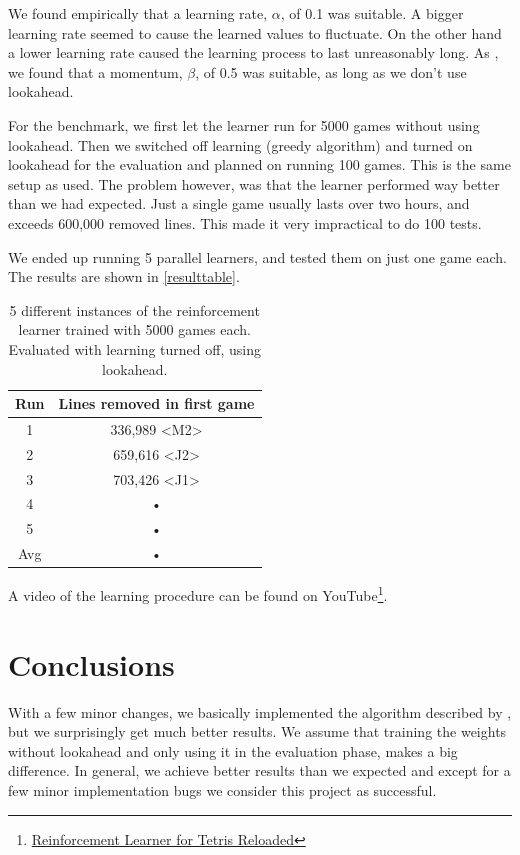 \documentclass{ml}
\begin{document}
We found empirically that a learning rate, $\alpha$, of 0.1 was suitable. A bigger learning rate seemed to cause the learned values to fluctuate.
On the other hand a lower learning rate caused the learning process to last unreasonably long. 
As \cite{zucker2009learning}, we found that a momentum, $\beta$, of 0.5 was suitable, as long as we don't use lookahead.

For the benchmark, we first let the learner run for 5000 games without using lookahead.
Then we switched off learning (greedy algorithm) and turned on lookahead for the evaluation and planned on running 100 games.
This is the same setup as \cite{zucker2009learning} used.
The problem however, was that the learner performed way better than we had expected. Just a single game usually lasts over two hours, and exceeds 600,000 removed lines.
This made it very impractical to do 100 tests. 

We ended up running 5 parallel learners, and tested them on just one game each. 
The results are shown in \autoref{resulttable}.

\begin{table}
\begin{center}
\begin{tabular}{|c|c|}
\hline 
Run & Lines removed in first game \\ 
\hline 
1 & 336,989 <M2> \\ 
\hline 
2 & 659,616 <J2> \\ 
\hline 
3 & 703,426 <J1> \\ 
\hline 
4 & • \\ 
\hline 
5 & • \\ 
\hline 
Avg & • \\ 
\hline 
\end{tabular}
\caption{5 different instances of the reinforcement learner trained with 5000 games each. Evaluated with learning turned off, using lookahead.}
\label{resulttable}
\end{center}
\end{table}


A video of the learning procedure can be found on YouTube\footnote{\href{http://www.youtube.com/watch?v=DXgtzFiRHdc}{Reinforcement Learner for Tetris Reloaded}}.


\section{Conclusions}
\label{conclusions}

With a few minor changes, we basically implemented the algorithm described by \cite{zucker2009learning}, but we surprisingly get much better results. 
We assume that training the weights without lookahead and only using it in the evaluation phase, makes a big difference. 
In general, we achieve better results than we expected and except for a few minor implementation bugs we consider this project as successful.


\newpage

%

\end{document}
